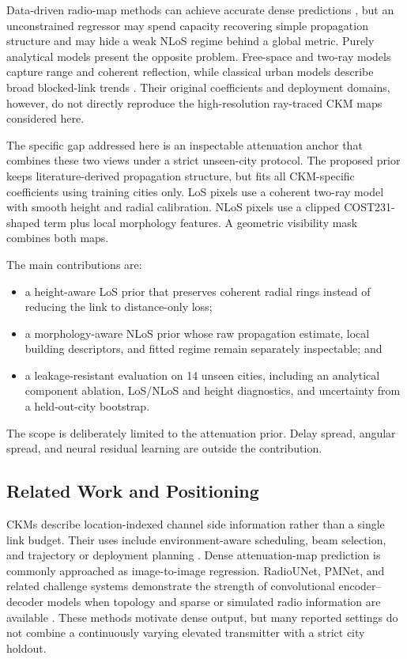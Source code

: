 \documentclass[10pt,conference]{IEEEtran}
\begin{document}
Data-driven radio-map methods can achieve accurate dense predictions
\cite{pmnet2023}, but an unconstrained regressor may spend capacity recovering
simple propagation structure and may hide a weak NLoS regime behind a global
metric. Purely analytical models present the opposite problem. Free-space and
two-ray models capture range and coherent reflection, while classical urban
models describe broad blocked-link trends \cite{cost231}. Their original
coefficients and deployment
domains, however, do not directly reproduce the high-resolution ray-traced CKM
maps considered here.

The specific gap addressed here is an inspectable attenuation anchor that
combines these two views under a strict unseen-city protocol. The proposed
prior keeps literature-derived
propagation structure, but fits all CKM-specific coefficients using training
cities only. LoS pixels use a coherent two-ray model with smooth height and
radial calibration. NLoS pixels use a clipped COST231-shaped term plus
local morphology features. A geometric visibility mask combines both maps.

The main contributions are:

\begin{itemize}
\item a height-aware LoS prior that preserves coherent radial rings instead of
reducing the link to distance-only loss;
\item a morphology-aware NLoS prior whose raw propagation estimate, local
building descriptors, and fitted regime remain separately inspectable; and
\item a leakage-resistant evaluation on 14 unseen cities, including an
analytical component ablation, LoS/NLoS and height diagnostics, and uncertainty
from a held-out-city bootstrap.
\end{itemize}

The scope is deliberately limited to the attenuation prior. Delay spread,
angular spread, and neural residual learning are outside the contribution.

\subsection{Related Work and Positioning}

CKMs describe location-indexed channel side information rather than a single
link budget. Their uses include environment-aware scheduling, beam selection,
and trajectory or deployment planning \cite{zengx2021ckm,ckmtutorial2024}.
Dense attenuation-map prediction is commonly approached as image-to-image
regression. RadioUNet, PMNet, and related challenge systems demonstrate the
strength of convolutional encoder--decoder models when topology and sparse or
simulated radio information are available \cite{radiounet2020,pmnet2023,
pmnet_icassp2023,icassp2023challenge}. These methods motivate dense output,
but many reported settings do not combine a continuously varying elevated
transmitter with a strict city holdout.
\end{document}
